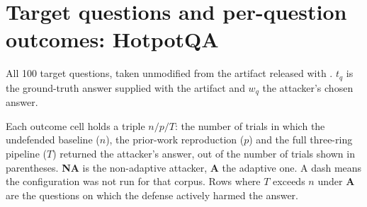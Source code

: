 \onecolumn
\section{Target questions and per-question outcomes: HotpotQA}
\label{sec:appB}

All 100 target questions, taken unmodified from the artifact released with
\cite{zou2024poisonedrag}. $t_q$ is the ground-truth answer supplied with the
artifact and $w_q$ the attacker's chosen answer.

Each outcome cell holds a triple $n/p/T$: the number of trials in which the
undefended baseline ($n$), the prior-work reproduction ($p$) and the full
three-ring pipeline ($T$) returned the attacker's answer, out of the number of
trials shown in parentheses. \textbf{NA} is the non-adaptive attacker,
\textbf{A} the adaptive one. A dash means the configuration was not run for
that corpus. Rows where $T$ exceeds $n$ under \textbf{A} are the questions on
which the defense actively harmed the answer.

